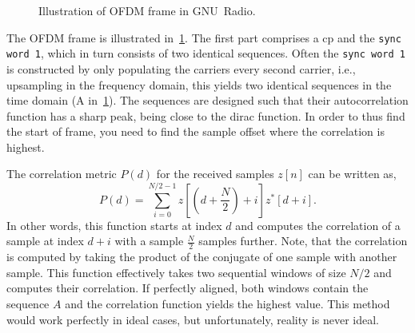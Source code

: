 \begin{figure}[htbp]
    \centering
\caption{Illustration of OFDM frame in GNU~Radio.}\label{fig:ofdm-frame-gnuradio}
\end{figure}

The OFDM frame is illustrated in~\cref{fig:ofdm-frame-gnuradio}. The first part comprises a \gls{cp} and the \texttt{sync word 1}, which in turn consists of two identical sequences. Often the \texttt{sync word 1} is constructed by only populating the carriers every second carrier, i.e., upsampling in the frequency domain, this yields two identical sequences in the time domain (A in~\cref{fig:ofdm-frame-gnuradio}). The sequences are designed such that their autocorrelation function has a sharp peak, being close to the dirac function. In order to thus find the start of frame, you need to find the sample offset where the correlation is highest. 

The correlation metric $P(d)$ for the received samples $z\left[n\right]$ can be written as,
\begin{equation}\label{eqOFDMpd} 
        P(d) = \sum_{i=0}^{N/2-1} z\left[\left(d+\frac{N}{2}\right)+ i\right]z^*\left[d+i\right].
\end{equation}
In other words, this function starts at index $d$ and computes the correlation of a sample at index $d+i$ with a sample $\frac{N}{2}$ samples further. Note, that the correlation is computed by taking the product of the conjugate of one sample with another sample. This function effectively takes two sequential windows of size $N/2$ and computes their correlation. If perfectly aligned, both windows contain the sequence $A$ and the correlation function yields the highest value. This method would work perfectly in ideal cases, but unfortunately, reality is never ideal. 

